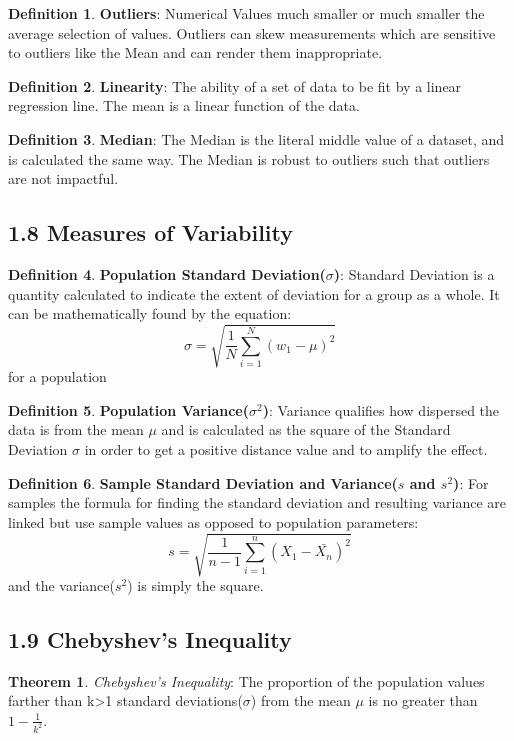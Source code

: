\documentclass[12pt]{amsart}
\theoremstyle{definition}
\newtheorem{theorem}{Theorem}  %
\newtheorem{definition}{Definition} %
\numberwithin{equation}{theorem}    %
\begin{document}
\begin{definition}
    \textbf{Outliers}:
    Numerical Values much smaller or much smaller the average selection of values. Outliers can skew measurements which are sensitive to outliers like the Mean and can render them inappropriate.
\end{definition}

\begin{definition}
    \textbf{Linearity}:
    The ability of a set of data to be fit by a linear regression line. The mean is a linear function of the data.
\end{definition}

\begin{definition}
    \textbf{Median}:
    The Median is the literal middle value of a dataset, and is calculated the same way. The Median is robust to outliers such that outliers are not impactful.
\end{definition}

\subsection*{1.8 Measures of Variability}
\begin{definition}
    \textbf{Population Standard Deviation($\sigma$)}:
    Standard Deviation is a quantity calculated to indicate the extent of deviation for a group as a whole. It can be mathematically found by the equation: 
    $$\sigma = \sqrt{\frac{1}{N}\sum^{N}_{i=1}(w_1 - \mu)^2}$$ for a population
\end{definition}

\begin{definition}
    \textbf{Population Variance($\sigma^2$)}:
    Variance qualifies how dispersed the data is from the mean $\mu$ and is calculated as the square of the Standard Deviation $\sigma$ in order to get a positive distance value and to amplify the effect.
\end{definition}

\begin{definition}
    \textbf{Sample Standard Deviation and Variance($s$ and $s^2$)}:
    For samples the formula for finding the standard deviation and resulting variance are linked but use sample values as opposed to population parameters:
    $$s = \sqrt{\frac{1}{n-1}\sum^{n}_{i=1}(X_1 - \bar{X_n})^2}$$ and the variance($s^2$) is simply the square.
\end{definition}
 
\subsection*{1.9 Chebyshev's Inequality}
\begin{theorem}
    \textit{Chebyshev's Inequality}:
        The proportion of the population values farther than k>1 standard deviations($\sigma$) from the mean $\mu$ is no greater than $1 - \frac{1}{k^2}$.
\end{theorem}
\end{document}
